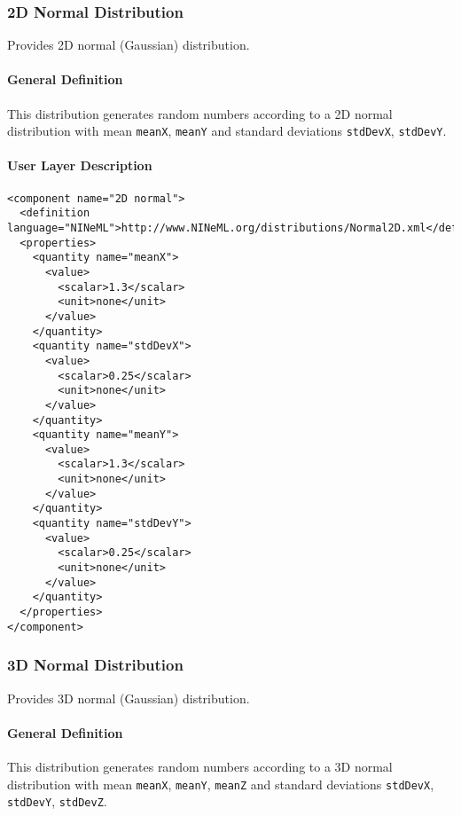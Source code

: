 \documentclass{article}
\begin{document}
\subsubsection{2D Normal Distribution}
\label{normal1D}

Provides 2D normal (Gaussian) distribution.

\paragraph{General Definition}
This distribution generates random numbers according to a 2D normal distribution
with mean {\tt meanX}, {\tt meanY} and standard deviations {\tt stdDevX}, {\tt stdDevY}.

\paragraph{User Layer Description}
\begin{verbatim}
<component name="2D normal">
  <definition language="NINeML">http://www.NINeML.org/distributions/Normal2D.xml</definition>
  <properties>
    <quantity name="meanX">
      <value>
        <scalar>1.3</scalar>
        <unit>none</unit>
      </value>
    </quantity>
    <quantity name="stdDevX">
      <value>
        <scalar>0.25</scalar>
        <unit>none</unit>
      </value>
    </quantity>
    <quantity name="meanY">
      <value>
        <scalar>1.3</scalar>
        <unit>none</unit>
      </value>
    </quantity>
    <quantity name="stdDevY">
      <value>
        <scalar>0.25</scalar>
        <unit>none</unit>
      </value>
    </quantity>
  </properties>
</component>
\end{verbatim}

\subsubsection{3D Normal Distribution}
\label{normal1D}

Provides 3D normal (Gaussian) distribution.

\paragraph{General Definition}
This distribution generates random numbers according to a 3D normal distribution
with mean {\tt meanX}, {\tt meanY}, {\tt meanZ} and standard deviations {\tt stdDevX},
{\tt stdDevY}, {\tt stdDevZ}.
\end{document}
